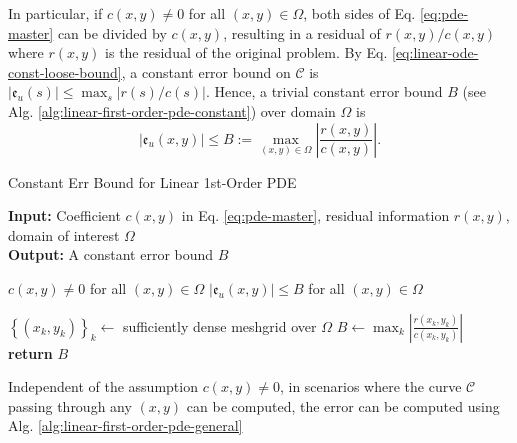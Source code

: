 \documentclass[accepted]{uai2023}
\newcommand{\Err}{\mathfrak{e}}
\begin{document}
    In particular, if $c(x, y) \neq 0$ for all $(x, y) \in \Omega$, both sides of Eq. \ref{eq:pde-master} can be divided by $c(x, y)$, resulting in a residual of $r(x, y)/c(x, y)$ where $r(x, y)$ is the residual of the original problem. By Eq. \ref{eq:linear-ode-const-loose-bound}, a constant error bound on $\mathcal{C}$ is $|\Err_u(s)| \leq \max_{s}\left|r(s)/c(s)\right|$. Hence, a trivial constant error bound $B$ (see Alg. \ref{alg:linear-first-order-pde-constant}) over domain $\Omega$ is
    {
        \small
        \begin{equation}
            |\Err_u(x, y)| \leq B :=\max_{(x, y)\in \Omega}\left|\frac{r(x, y)}{c(x, y)}\right|.
        \end{equation}
    }

    \begin{algorithm}
        \small
        \caption{Constant Err Bound for Linear 1st-Order PDE}\label{alg:linear-first-order-pde-constant}
        \textbf{Input:} Coefficient $c(x, y)$ in Eq. \ref{eq:pde-master}, residual information $r(x, y)$, domain of interest $\Omega$\\
        \textbf{Output:} A constant error bound $B$
        \begin{algorithmic}
            \Require $c(x, y) \neq 0$ for all $(x, y) \in \Omega$
            \Ensure $|\Err_{u}(x, y)| \leq B$ for all $(x, y) \in \Omega$

            \State $\left\{(x_k, y_k)\right\}_{k} \gets$ sufficiently dense meshgrid over $\Omega$
            \State $\displaystyle B \gets \max_{k} \left| \frac{r(x_k, y_k)}{c(x_k, y_k)}\right|$
            \vspace{-0.25em}
            \State \textbf{return} $B$
        \end{algorithmic}
    \end{algorithm}

    Independent of the assumption $c(x, y)\neq 0$, in scenarios where the curve $\mathcal{C}$ passing through any $(x, y)$ can be computed, the error can be computed using Alg. \ref{alg:linear-first-order-pde-general}
\end{document}
